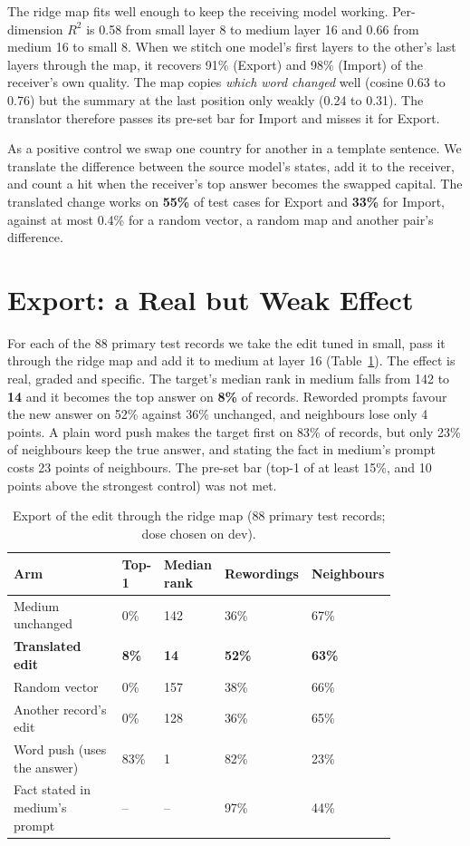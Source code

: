 The ridge map fits well enough to keep the receiving model working. Per-dimension $R^2$ is 0.58 from small layer 8 to medium layer 16 and 0.66 from medium 16 to small 8. When we stitch one model's first layers to the other's last layers through the map, it recovers 91\% (Export) and 98\% (Import) of the receiver's own quality. The map copies \emph{which word changed} well (cosine 0.63 to 0.76) but the summary at the last position only weakly (0.24 to 0.31). The translator therefore passes its pre-set bar for Import and misses it for Export.

As a positive control we swap one country for another in a template sentence. We translate the difference between the source model's states, add it to the receiver, and count a hit when the receiver's top answer becomes the swapped capital. The translated change works on \textbf{55\%} of test cases for Export and \textbf{33\%} for Import, against at most 0.4\% for a random vector, a random map and another pair's difference.

\section{Export: a Real but Weak Effect}\label{sec:export}

For each of the 88 primary test records we take the edit tuned in small, pass it through the ridge map and add it to medium at layer 16 (Table~\ref{tab:export}). The effect is real, graded and specific. The target's median rank in medium falls from 142 to \textbf{14} and it becomes the top answer on \textbf{8\%} of records. Reworded prompts favour the new answer on 52\% against 36\% unchanged, and neighbours lose only 4 points. A plain word push makes the target first on 83\% of records, but only 23\% of neighbours keep the true answer, and stating the fact in medium's prompt costs 23 points of neighbours. The pre-set bar (top-1 of at least 15\%, and 10 points above the strongest control) was not met.

\begin{table}[t]
\centering\small
\caption{Export of the edit through the ridge map (88 primary test records; dose chosen on dev).}\label{tab:export}
\begin{tabular}{|p{0.38\linewidth}|p{0.10\linewidth}|p{0.12\linewidth}|p{0.12\linewidth}|p{0.12\linewidth}|}
\hline
\textbf{Arm} & \textbf{Top-1} & \textbf{Median rank} & \textbf{Rewordings} & \textbf{Neighbours}\\ \hline
Medium unchanged & 0\% & 142 & 36\% & 67\%\\ \hline
\textbf{Translated edit} & \textbf{8\%} & \textbf{14} & \textbf{52\%} & \textbf{63\%}\\ \hline
Random vector & 0\% & 157 & 38\% & 66\%\\ \hline
Another record's edit & 0\% & 128 & 36\% & 65\%\\ \hline
Word push (uses the answer) & 83\% & 1 & 82\% & 23\%\\ \hline
Fact stated in medium's prompt & -- & -- & 97\% & 44\%\\ \hline
\end{tabular}
\end{table}

